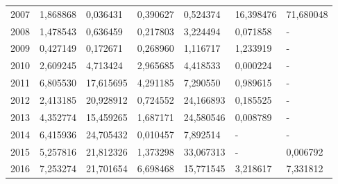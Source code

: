 \begin{table}
\begin{tabular}{p{1cm}p{2cm}p{2cm}p{2cm}p{2cm}p{2cm}p{2cm}}
 2007 &                                     1,868868 &                                   0,036431 &                           0,390627 &                       0,524374 &                                   16,398476 &                                 71,680048 \\
 2008 &                                     1,478543 &                                   0,636459 &                           0,217803 &                       3,224494 &                                    0,071858 &                                         - \\
 2009 &                                     0,427149 &                                   0,172671 &                           0,268960 &                       1,116717 &                                    1,233919 &                                         - \\
 2010 &                                     2,609245 &                                   4,713424 &                           2,965685 &                       4,418533 &                                    0,000224 &                                         - \\
 2011 &                                     6,805530 &                                  17,615695 &                           4,291185 &                       7,290550 &                                    0,989615 &                                         - \\
 2012 &                                     2,413185 &                                  20,928912 &                           0,724552 &                      24,166893 &                                    0,185525 &                                         - \\
 2013 &                                     4,352774 &                                  15,459265 &                           1,687171 &                      24,580546 &                                    0,008789 &                                         - \\
 2014 &                                     6,415936 &                                  24,705432 &                           0,010457 &                       7,892514 &                                           - &                                         - \\
 2015 &                                     5,257816 &                                  21,812326 &                           1,373298 &                      33,067313 &                                           - &                                  0,006792 \\
 2016 &                                     7,253274 &                                  21,701654 &                           6,698468 &                      15,771545 &                                    3,218617 &                                  7,331812 \\
\bottomrule
\end{tabular}
\end{table}

